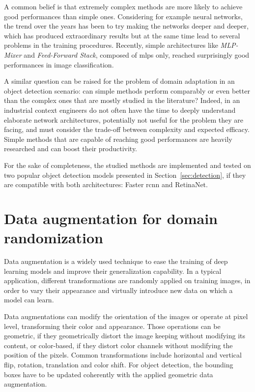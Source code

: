\documentclass[%
    corpo=12pt,
    twoside,
    stile=classica,   
    tipotesi=magistrale,
    evenboxes,
    english,
	numerazioneromana,
]{toptesi}
\begin{document}
A common belief is that extremely complex methods are more likely to achieve good performances than simple ones. Considering for example neural networks, the trend over the years has been to try making the networks deeper and deeper, which has produced extraordinary results but at the same time lead to several problems in the training procedures. Recently, simple architectures like \textit{MLP-Mixer}\cite{tolstikhin2021mlpmixer} and \textit{Feed-Forward Stack}\cite{melaskyriazi2021need}, composed of \glspl{mlp} only, reached surprisingly good performances in image classification.

A similar question can be raised for the problem of domain adaptation in an object detection scenario: can simple methods perform comparably or even better than the complex ones that are mostly studied in the literature? Indeed, in an industrial context engineers do not often have the time to deeply understand elaborate network architectures, potentially not useful for the problem they are facing, and must consider the trade-off between complexity and expected efficacy. Simple methods that are capable of reaching good performances are heavily researched and can boost their productivity.

For the sake of completeness, the studied methods are implemented and tested on two popular object detection models presented in Section~\ref{sec:detection}, if they are compatible with both architectures: Faster \gls{rcnn} and RetinaNet.

\section{Data augmentation for domain randomization}\label{sec:dataaug}
Data augmentation is a widely used technique to ease the training of deep learning models and improve their generalization capability. In a typical application, different transformations are randomly applied on training images, in order to vary their appearance and virtually introduce new data on which a model can learn.

Data augmentations can modify the orientation of the images or operate at pixel level, transforming their color and appearance. Those operations can be geometric, if they geometrically distort the image keeping without modifying its content, or color-based, if they distort color channels without modifying the position of the pixels. Common transformations include horizontal and vertical flip, rotation, translation and color shift. For object detection, the bounding boxes have to be updated coherently with the applied geometric data augmentation.
\end{document}
